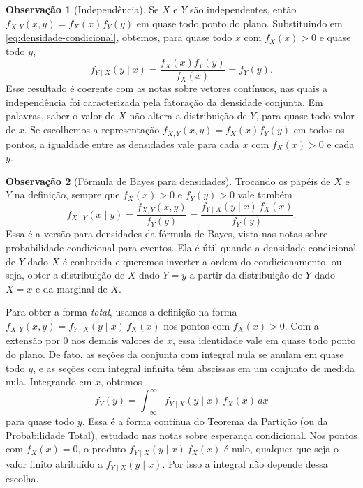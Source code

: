 \documentclass[12pt,portuguese]{article}
\theoremstyle{definition}
\newtheorem{remark}[remark]{Observação}
\theoremstyle{plainexercise}
\theoremstyle{starredexercise}
\theoremstyle{definition}
\begin{document}
\begin{remark}[Independência]\label{rem:independencia-condicional}
  Se $X$ e $Y$ são independentes, então $f_{X,Y}(x,y) = f_X(x) f_Y(y)$ em quase todo
  ponto do plano. Substituindo em \eqref{eq:densidade-condicional}, obtemos,
  para quase todo $x$ com $f_X(x) > 0$ e quase todo $y$,
  \[
    f_{Y\mid X}(y \mid x)
    = \frac{f_X(x) f_Y(y)}{f_X(x)} = f_Y(y).
  \]
  Esse resultado é coerente com as notas sobre vetores contínuos, nas quais a
  independência foi caracterizada pela fatoração da densidade conjunta. Em palavras, saber
  o valor de $X$ não altera a distribuição de $Y$, para quase todo valor de $x$.
  Se escolhemos a representação $f_{X,Y}(x,y)=f_X(x)f_Y(y)$ em todos os pontos,
  a igualdade entre as densidades vale para cada $x$ com $f_X(x)>0$ e cada $y$.
\end{remark}

\begin{remark}[Fórmula de Bayes para densidades]\label{rem:bayes-densidades}
  Trocando os papéis de $X$ e $Y$ na definição, sempre que $f_X(x) > 0$ e $f_Y(y) > 0$
  vale também
  \[
    f_{X\mid Y}(x \mid y)
    = \frac{f_{X,Y}(x,y)}{f_Y(y)}
    = \frac{f_{Y\mid X}(y \mid x)\, f_X(x)}{f_Y(y)}.
  \]
  Essa é a versão para densidades da fórmula de Bayes, vista nas notas sobre probabilidade
  condicional para eventos. Ela é útil quando a densidade condicional de $Y$ dado $X$ é
  conhecida e queremos inverter a ordem do condicionamento, ou seja, obter a distribuição
  de $X$ dado $Y = y$ a partir da distribuição de $Y$ dado $X = x$ e da marginal de $X$.

  Para obter a forma \emph{total}, usamos a definição na forma
  $f_{X,Y}(x,y)=f_{Y\mid X}(y\mid x)\,f_X(x)$ nos pontos com $f_X(x)>0$.
  Com a extensão por $0$ nos demais valores de $x$, essa identidade vale
  em quase todo ponto do plano.
  De fato, as seções da conjunta com integral nula se anulam em quase todo $y$,
  e as seções com integral infinita têm abscissas em um conjunto de medida nula.
  Integrando em $x$, obtemos
  \[
    f_Y(y) = \int_{-\infty}^{\infty} f_{Y\mid X}(y \mid x)\, f_X(x)\,dx
  \]
  para quase todo $y$. Essa é a forma contínua do Teorema da Partição (ou da Probabilidade
  Total), estudado nas notas sobre esperança condicional. Nos pontos com $f_X(x) = 0$, o
  produto $f_{Y\mid X}(y \mid x)\, f_X(x)$ é nulo, qualquer que seja o valor finito
  atribuído a $f_{Y\mid X}(y \mid x)$. Por isso a integral não depende dessa escolha.
\end{remark}
\end{document}
